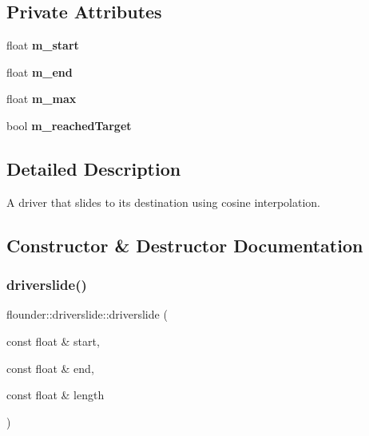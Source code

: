 \subsection*{Private Attributes}
\begin{DoxyCompactItemize}
\item 
\mbox{\label{classflounder_1_1driverslide_a649f67c646303f4e870628eee498b266}} 
float {\bfseries m\+\_\+start}
\item 
\mbox{\label{classflounder_1_1driverslide_a836d4e6bd463aaed8eb253cf12b78161}} 
float {\bfseries m\+\_\+end}
\item 
\mbox{\label{classflounder_1_1driverslide_a1c4222bdf18d8ff1174ed26163f81e19}} 
float {\bfseries m\+\_\+max}
\item 
\mbox{\label{classflounder_1_1driverslide_a31c9d82469df7e5eaa2c2de1565ae12f}} 
bool {\bfseries m\+\_\+reached\+Target}
\end{DoxyCompactItemize}


\subsection{Detailed Description}
A driver that slides to its destination using cosine interpolation. 



\subsection{Constructor \& Destructor Documentation}
\mbox{\label{classflounder_1_1driverslide_a9e4b295bdb0ce7254fb7c4d7313f8b22}} 
\subsubsection{\texorpdfstring{driverslide()}{driverslide()}}
{\footnotesize\ttfamily flounder\+::driverslide\+::driverslide (\begin{DoxyParamCaption}\item[{const float \&}]{start,  }\item[{const float \&}]{end,  }\item[{const float \&}]{length }\end{DoxyParamCaption})}



